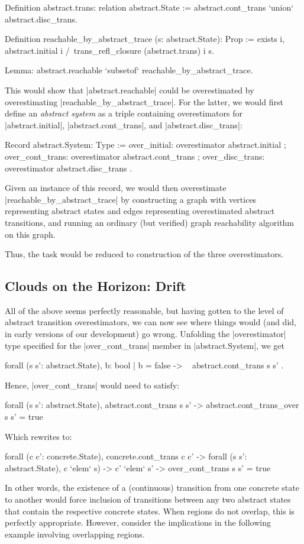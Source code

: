 \documentclass[runningheads]{llncs}
\begin{document}
\begin{code}
  Definition abstract.trans: relation abstract.State :=
    abstract.cont_trans `union` abstract.disc_trans.

  Definition reachable_by_abstract_trace (s: abstract.State): Prop
    := exists i, abstract.initial i /\ trans_refl_closure (abstract.trans) i s.

  Lemma: abstract.reachable `subsetof` reachable_by_abstract_trace.
\end{code}
This would show that |abstract.reachable| could be overestimated by overestimating |reachable_by_abstract_trace|. For the latter, we would first define an \emph{abstract system} as a triple containing overestimators for |abstract.initial|, |abstract.cont_trans|, and |abstract.disc_trans|:
\begin{code}
Record abstract.System: Type :=
  { over_initial: overestimator abstract.initial
  ; over_cont_trans: overestimator abstract.cont_trans
  ; over_disc_trans: overestimator abstract.disc_trans
  }.
\end{code}
Given an instance of this record, we would then overestimate |reachable_by_abstract_trace| by constructing a graph with vertices representing abstract states and edges representing overestimated abstract transitions, and running an ordinary (but verified) graph reachability algorithm on this graph.

Thus, the task would be reduced to construction of the three overestimators.

\subsection{Clouds on the Horizon: Drift}
\label{trouble}

All of the above seems perfectly reasonable, but having gotten to the level of abstract transition overestimators, we can now see where things would (and did, in early versions of our development) go wrong. Unfolding the |overestimator| type specified for the |over_cont_trans| member in |abstract.System|, we get
\begin{code}
  forall (s s': abstract.State), { b: bool | b = false -> ~ abstract.cont_trans s s' }.
\end{code}
Hence, |over_cont_trans| would need to satisfy:
\begin{code}
  forall (s s': abstract.State), abstract.cont_trans s s' ->
    abstract.cont_trans_over s s' = true
\end{code}
Which rewrites to:
\begin{code}
  forall (c c': concrete.State), concrete.cont_trans c c' ->
  forall (s s': abstract.State), c `elem` s) -> c' `elem` s' ->
    over_cont_trans s s' = true
\end{code}
In other words, the existence of a (continuous) transition from one concrete state to another would force inclusion of transitions between any two abstract states that contain the respective concrete states. When regions do not overlap, this is perfectly appropriate. However, consider the implications in the following example involving overlapping regions.
\end{document}
